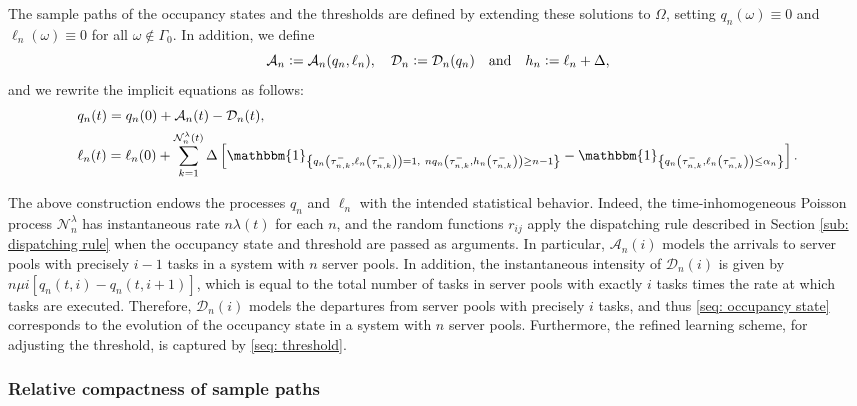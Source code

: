 \documentclass[a4paper, 12pt]{article}
\theoremstyle{definition}
\newcommand{\ind}[1]{\mathbbm{1}_{\left\{#1\right\}}}
\newcommand{\defeq}{\vcentcolon=}
\newcommand{\calA}{\mathcal{A}}
\newcommand{\calD}{\mathcal{D}}
\newcommand{\calN}{\mathcal{N}}
\begin{document}
The sample paths of the occupancy states and the thresholds are defined by extending these solutions to $\Omega$, setting $q_n(\omega) \equiv 0$ and $\ell_n(\omega) \equiv 0$ for all $\omega \notin \Gamma_0$. In addition, we define
\begin{equation*}
	\calA_n \defeq \calA_n(q_n, \ell_n), \quad \calD_n \defeq \calD_n(q_n) \quad \text{and} \quad h_n \defeq \ell_n + \Delta,
\end{equation*}
and we rewrite the implicit equations as follows:
\begin{subequations}
	\begin{align}
		&q_n(t) = q_n(0) + \calA_n(t) - \calD_n(t), \label{seq: occupancy state}\\
		&\ell_n(t) = \ell_n(0) + \sum_{k = 1}^{\calN_n^\lambda(t)} \Delta \left[\ind{q_n\left(\tau_{n, k}^-, \ell_n\left(\tau_{n, k}^-\right)\right) = 1,\ nq_n\left(\tau_{n, k}^-, h_n\left(\tau_{n, k}^-\right)\right) \geq n - 1} - \ind{q_n\left(\tau_{n, k}^-, \ell_n\left(\tau_{n, k}^-\right)\right) \leq \alpha_n}\right]. \label{seq: threshold}
	\end{align}
\end{subequations}

The above construction endows the processes $q_n$ and $\ell_n$ with the intended statistical behavior. Indeed, the time-inhomogeneous Poisson process $\calN_n^\lambda$ has instantaneous rate $n\lambda(t)$ for each $n$, and the random functions $r_{ij}$ apply the dispatching rule described in Section \ref{sub: dispatching rule} when the occupancy state and threshold are passed as arguments. In particular, $\calA_n(i)$ models the arrivals to server pools with precisely $i - 1$ tasks in a system with $n$ server pools. In addition, the instantaneous intensity of $\calD_n(i)$ is given by $n\mu i[q_n(t, i) - q_{n}(t, i + 1)]$, which is equal to the total number of tasks in server pools with exactly $i$ tasks times the rate at which tasks are executed. Therefore, $\calD_n(i)$ models the departures from server pools with precisely $i$ tasks, and thus \eqref{seq: occupancy state} corresponds to the evolution of the occupancy state in a system with $n$ server pools. Furthermore, the refined learning scheme, for adjusting the threshold, is captured by \eqref{seq: threshold}.

\subsubsection{Relative compactness of sample paths}
\label{subsub: relative compactness exponential case}
\end{document}
